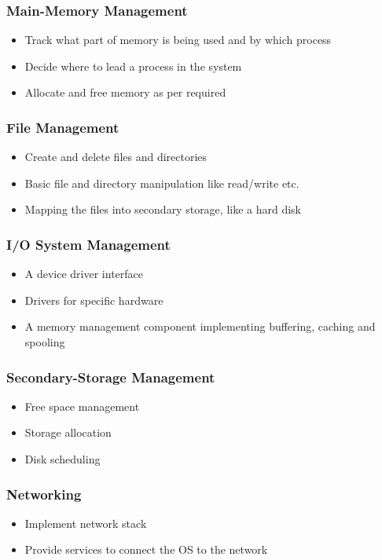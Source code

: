 \documentclass[11pt]{article}
\theoremstyle{definition}
\begin{document}
        \subsubsection{Main-Memory Management}
            \begin{itemize}
                \item Track what part of memory is being used and by which process
                \item Decide where to lead a process in the system
                \item Allocate and free memory as per required
            \end{itemize}
        \subsubsection{File Management}
            \begin{itemize}
                \item Create and delete files and directories
                \item Basic file and directory manipulation like read/write etc.
                \item Mapping the files into secondary storage, like a hard disk
            \end{itemize}
        \subsubsection{I/O System Management}
            \begin{itemize}
                \item A device driver interface
                \item Drivers for specific hardware
                \item A memory management component implementing buffering, caching and spooling
            \end{itemize}
        \subsubsection{Secondary-Storage Management}
            \begin{itemize}
                \item Free space management
                \item Storage allocation
                \item Disk scheduling
            \end{itemize}
        \subsubsection{Networking}
            \begin{itemize}
                \item Implement network stack
                \item Provide services to connect the OS to the network
            \end{itemize}
\end{document}
